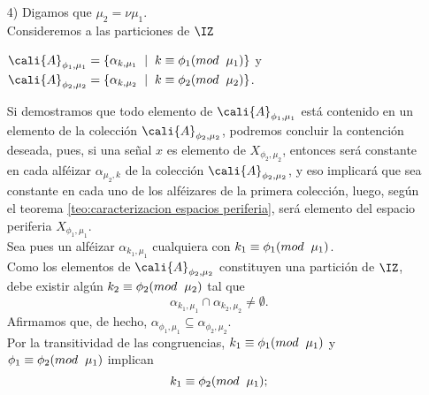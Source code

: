 \begin{dem}
\begin{itemize}
\item[4) ]
Digamos que $\mu_{2}= \nu \mu_{1}$. \\
Consideremos a las particiones de $\IZ$
\begin{center}
 $\cali{A}_{\phi_{1}, \mu_{1}} = \{\alpha_{k, \mu_{1}} \hspace{0.2cm} |
\hspace{0.2cm} k \equiv \phi_{1} (mod \hspace{0.2cm} \mu_{1}) \} $
y 
$\cali{A}_{\phi_{2}, \mu_{2}} = \{\alpha_{k, \mu_{2}} \hspace{0.2cm} |
\hspace{0.2cm} k \equiv \phi _{2} (mod \hspace{0.2cm} \mu_{2}) \} $.
\end{center}

Si demostramos que todo elemento de $\cali{A}_{\phi_{1}, \mu_{1}}$
está contenido en un elemento de la colección $\cali{A}_{\phi_{2}, \mu_{2}}$,
podremos concluir la contención deseada, pues,
si una señal $x$ es elemento de $X_{\phi_{2}, \mu_{2}}$, 
entonces será constante en cada alféizar
$\alpha_{\mu_{2}, k}$ de la colección 
$\cali{A}_{\phi_{2}, \mu_{2}}$, y eso implicará que sea constante en 
cada uno de los alféizares de la primera colección, luego, según
el teorema \ref{teo:caracterizacion espacios periferia},
será elemento del espacio periferia $X_{\phi_{1}, \mu_{1}}$. \\


Sea pues un alféizar $\alpha_{k_{1}, \mu_{1}}$ cualquiera
con $k_{1} \equiv \phi_{1} (mod \hspace{0.2cm} \mu_{1})$. \\
Como los elementos de $\cali{A}_{\phi_{2}, \mu_{2}}$ constituyen una
partición de $\IZ$, debe existir algún 
$k_{2} \equiv \phi_{2} (mod \hspace{0.2cm} \mu_{2})$
tal que
\[
\alpha_{k_{1}, \mu_{1}} \cap \alpha_{k_{2}, \mu_{2}} \neq \emptyset.
\]
Afirmamos que, de hecho, $\alpha_{\phi_{1}, \mu_{1}} \subseteq 
\alpha_{\phi_{2}, \mu_{2}}$. \\
Por la transitividad de las congruencias,
$k_{1} \equiv \phi_{1} (mod \hspace{0.2cm} \mu_{1})$ y
$\phi_{1} \equiv \phi_{2} (mod \hspace{0.2cm} \mu_{1})$
implican 
\begin{equation} \label{eq1: 29Sept}
k_{1} \equiv \phi_{2} (mod \hspace{0.2cm} \mu_{1});
\end{equation}


\end{itemize}
\end{dem}

